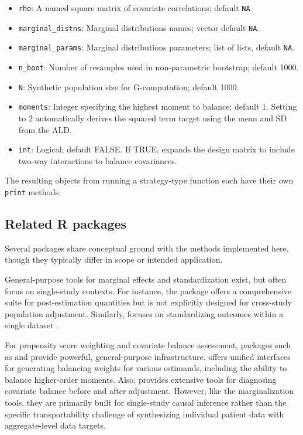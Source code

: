 \documentclass[article]{jss}
\begin{document}
\begin{itemize}
    \item \texttt{rho}: A named square matrix of covariate correlations; default \texttt{NA}.
    \item \texttt{marginal\_distns}: Marginal distributions names; vector default \texttt{NA}.
    \item \texttt{marginal\_params}: Marginal distributions parameters; list of lists, default \texttt{NA}.
    \item \texttt{n\_boot}: Number of resamples used in non-parametric bootstrap; default 1000.
    \item \texttt{N}: Synthetic population size for G-computation; default 1000.
    \item \texttt{moments}: Integer specifying the highest moment to balance; default 1. Setting to 2 automatically derives the squared term target using the mean and SD from the ALD.
    \item \texttt{int}: Logical; default FALSE. If TRUE, expands the design matrix to include two-way interactions to balance covariances.
\end{itemize}
The resulting objects from running a strategy-type function each have their own \texttt{print} methods.


\subsection{Related R packages}
Several  packages share conceptual ground with the methods implemented here, though they typically differ in scope or intended application.

General-purpose tools for marginal effects and standardization exist, but often focus on single-study contexts. For instance, the  package \citep{aari_marginaleffects_2024} offers a comprehensive suite for post-estimation quantities but is not explicitly designed for cross-study population adjustment. Similarly,  focuses on standardizing outcomes within a single dataset \citep{g_sofer_2023_10022204}.

For propensity score weighting and covariate balance assessment, packages such as  \citep{greifer_weightit_2024} and  \citep{greifer_cobalt_2024} provide powerful, general-purpose infrastructure.  offers unified interfaces for generating balancing weights for various estimands, including the ability to balance higher-order moments. Also,  provides extensive tools for diagnosing covariate balance before and after adjustment. However, like the marginalization tools, they are primarily built for single-study causal inference rather than the specific transportability challenge of synthesizing individual patient data with aggregate-level data targets.
\end{document}
